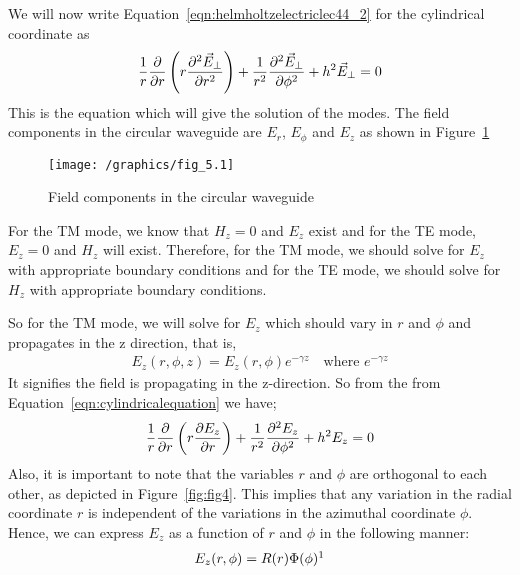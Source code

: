 We will now write Equation~\ref{eqn:helmholtzelectriclec44_2} for the cylindrical coordinate as 
\begin{align}
\frac{1}{r}\partialderivative{}{r}\left(r\partialderivative[2]{\vec{E}_\bot}{r}\right) + \frac{1}{r^2}\partialderivative[2]{\vec{E}_\bot}{\phi}+ h^2\vec{E}_\bot = 0 
\label{eqn:cylindricalequation}   
\end{align}
This is the equation which will give the solution of the modes. The field components in the circular waveguide are $E_r$, $E_\phi$ and $E_z$ as shown in Figure~\ref{fig:fig5}
\begin{figure}[h]
\centering
\texttt{[image: /graphics/fig\_5.1]}
\caption{Field components in the circular waveguide}
\label{fig:fig5}
\end{figure}

For the TM mode, we know that $H_z=0$ and $E_z$ exist and for the TE mode, $E_z=0$ and $H_z$ will exist. Therefore, for the TM mode, we should solve for $E_z$ with appropriate boundary conditions and for the TE mode, we should solve for $H_z$ with appropriate boundary conditions. 

So for the TM mode, we will solve for $E_z$ which should vary in $r$ and $\phi$ and propagates in the z direction, that is,
\begin{align*}
E_z(r,\phi, z)=E_z(r,\phi)e^{-\gamma z}\quad\text{where }e^{-\gamma z}
\end{align*}
It signifies the field is propagating in the z-direction. So from the from Equation~\eqref{eqn:cylindricalequation} we have;
\begin{equation}
\frac{1}{r}\partialderivative{}{r}\left(r\partialderivative{E_z}{r}\right) + \frac{1}{r^2}\partialderivative[2]{E_z}{\phi} + h^2 E_z = 0 
\label{eqn:pdecircularwaveguide}
\end{equation}
Also, it is important to note that the variables $r$ and $\phi$ are orthogonal to each other, as depicted in Figure~\ref{fig:fig4}. This implies that any variation in the radial coordinate $r$ is independent of the variations in the azimuthal coordinate $\phi$. Hence, we can express $E_z$ as a function of $r$ and $\phi$ in the following manner:
\begin{align*}
E_z(r, \phi) = R(r)\Phi(\phi)\footnotemark
\end{align*}

